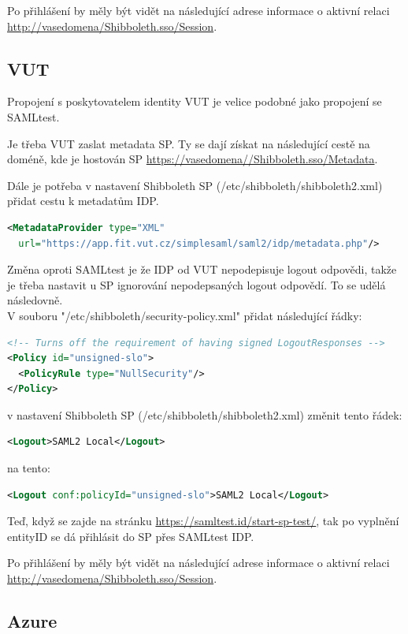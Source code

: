 Po přihlášení by měly být vidět na následující adrese informace o aktivní relaci \url{http://vasedomena/Shibboleth.sso/Session}.

\subsection{VUT}
Propojení s poskytovatelem identity VUT je velice podobné jako propojení se SAMLtest.



Je třeba VUT zaslat metadata SP. Ty se dají získat na následující cestě na doméně, kde je hostován SP \url{https://vasedomena//Shibboleth.sso/Metadata}.

Dále je potřeba v nastavení Shibboleth SP (/etc/shibboleth/shibboleth2.xml) přidat cestu k metadatům IDP.
\begin{lstlisting}[language=XML]
 <MetadataProvider type="XML"
  url="https://app.fit.vut.cz/simplesaml/saml2/idp/metadata.php"/>
\end{lstlisting}

Změna oproti SAMLtest je že IDP od VUT nepodepisuje logout odpovědi, takže je třeba nastavit u SP ignorování nepodepsaných logout odpovědí. To se udělá následovně.\\
V souboru  "/etc/shibboleth/security-policy.xml" přidat následující řádky:
\begin{lstlisting}[language=XML]
<!-- Turns off the requirement of having signed LogoutResponses -->
<Policy id="unsigned-slo">
  <PolicyRule type="NullSecurity"/>
</Policy>
\end{lstlisting}

 v nastavení Shibboleth SP (/etc/shibboleth/shibboleth2.xml)
 změnit tento řádek:
 \begin{lstlisting}[language=XML]
 <Logout>SAML2 Local</Logout>
\end{lstlisting}
na tento:
 \begin{lstlisting}[language=XML]
 <Logout conf:policyId="unsigned-slo">SAML2 Local</Logout>
\end{lstlisting}

Teď, když se zajde na stránku \url{https://samltest.id/start-sp-test/}, tak po vyplnění entityID se dá přihlásit do SP přes SAMLtest IDP.

Po přihlášení by měly být vidět na následující adrese informace o aktivní relaci \url{http://vasedomena/Shibboleth.sso/Session}.

\subsection{Azure}

